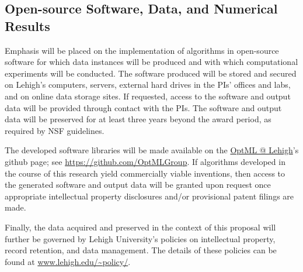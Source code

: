 \documentclass[10pt]{SelfArx}
\begin{document}
\subsection*{Open-source Software, Data, and Numerical Results} 

Emphasis will be placed on the implementation of algorithms in open-source software for which data instances will be produced and with which computational experiments will be conducted.  The software produced will be stored and secured on Lehigh's computers, servers, external hard drives in the PIs' offices and labs, and on online data storage sites.  If requested, access to the software and output data will be provided through contact with the PIs.  The software and output data will be preserved for at least three years beyond the award period, as required by NSF guidelines.

The developed software libraries will be made available on the \href{http://optml.lehigh.edu/}{OptML @ Lehigh}'s github page; see \url{https://github.com/OptMLGroup}.  If algorithms developed in the course of this research yield commercially viable inventions, then access to the generated software and output data will be granted upon request once appropriate intellectual property disclosures and/or provisional patent filings are made.

Finally, the data acquired and preserved in the context of this proposal will further be governed by Lehigh University's policies on intellectual property, record retention, and data management. The details of these policies can be found at \href{http://www.lehigh.edu/~policy/}{www.lehigh.edu/\~{}policy/}.
 
\end{document}
